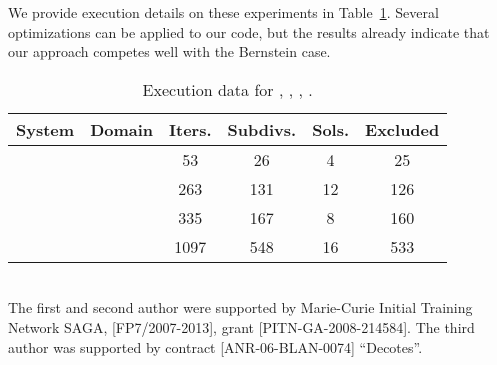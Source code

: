 \documentclass{sig-alternate}
\begin{document}
We provide execution details on
these experiments in
Table~\ref{tab:exec}. Several
optimizations can be applied to our
code, but the results already
indicate that our approach competes
well with the Bernstein case.

\begin{table} \begin{center}\begin{tabular}{|c|c|c|c|c|c|} \hline System     & Domain   &Iters.& Subdivs. & Sols. & Excluded \\ \hline \hline
 &&53    &26        & 4     & 25   \\ \hline
 &&263   &131       &12     & 126  \\ \hline
 &&335   &167       &8      &160   \\ \hline
 && 1097 & 548      & 16    &533   \\ \hline
\end{tabular}\end{center}
\caption{Execution data for , , , .}
\label{tab:exec}
\end{table}

\vspace{.1cm}

\\
The first and second author were supported by Marie-Curie Initial
Training Network SAGA, [FP7/2007-2013], grant
[PITN-GA-2008-214584]. The third author was supported by contract
[ANR-06-BLAN-0074] ``Decotes''.
\end{document}
